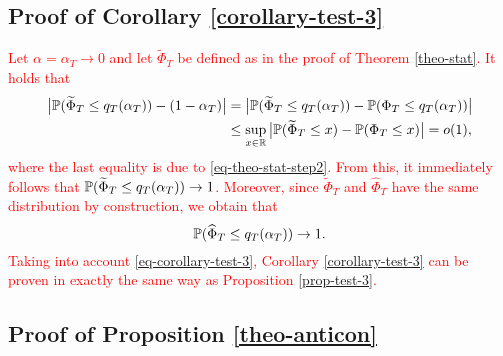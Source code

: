 \subsection*{Proof of Corollary \ref{corollary-test-3}}


\textcolor{red}{
Let $\alpha = \alpha_T \rightarrow 0$ and let $\widetilde{\Phi}_T$ be defined as in the proof of Theorem \ref{theo-stat}. It holds that 
\begin{align*} 
\big| \mathbb{P}(\widetilde{\Phi}_T \le q_T(\alpha_T)) - (1-\alpha_T) \big| 
 & = \big| \mathbb{P}(\widetilde{\Phi}_T \le q_T(\alpha_T)) - \mathbb{P}(\Phi_T \le q_T(\alpha_T)) \big| \\*
 & \le \sup_{x \in \mathbb{R}} \big| \mathbb{P}(\widetilde{\Phi}_T \le x) - \mathbb{P}(\Phi_T \le x) \big| = o(1), 
\end{align*}
where the last equality is due to \eqref{eq-theo-stat-step2}. From this, it immediately follows that $\mathbb{P}(\widetilde{\Phi}_T \le q_T(\alpha_T)) \rightarrow 1$. Moreover, since $\widetilde{\Phi}_T$ and $\widehat{\Phi}_T$ have the same distribution by construction, we obtain that 
\begin{equation}\label{eq-corollary-test-3}
\mathbb{P}(\widehat{\Phi}_T \le q_T(\alpha_T)) \rightarrow 1. 
\end{equation}
Taking into account \eqref{eq-corollary-test-3}, Corollary \ref{corollary-test-3} can be proven in exactly the same way as Proposition  \ref{prop-test-3}. 
}



\subsection*{Proof of Proposition \ref{theo-anticon}}

